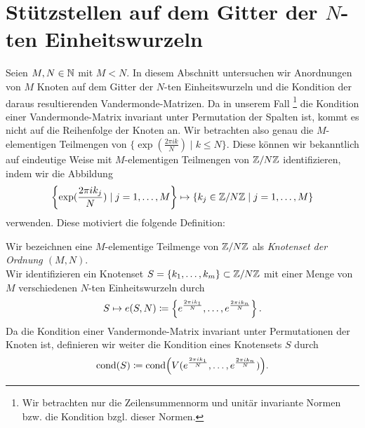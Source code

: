 \section{Stützstellen auf dem Gitter der $N$-ten Einheitswurzeln}
Seien $M, N \in \mathbb{N}$ mit $M < N$.
In diesem Abschnitt untersuchen wir Anordnungen von $M$ Knoten auf dem Gitter
der $N$-ten Einheitswurzeln und die Kondition der daraus resultierenden
Vandermonde-Matrizen.
Da in unserem Fall
\footnote{Wir betrachten nur die Zeilensummennorm und unitär invariante Normen bzw. die Kondition bzgl. dieser Normen.}
die Kondition einer Vandermonde-Matrix invariant unter
Permutation der Spalten ist, kommt es nicht auf die Reihenfolge der Knoten an.
Wir betrachten also genau die $M$-elementigen Teilmengen von
$\{ \exp( \frac{2 \pi i k}{N} ) \; | \; k \leq N \}$.
Diese können wir bekanntlich auf eindeutige Weise mit $M$-elementigen
Teilmengen von $ \mathbb{Z} / N\mathbb{Z}$ identifizieren, indem wir die Abbildung
\[
    \left\{ \exp( \frac{2 \pi i k_j}{N} ) \; | \; j = 1,\dots, M \right\} \mapsto \left\{ k_j \in \mathbb{Z}/N\mathbb{Z} \; | \; j = 1, \dots, M \right\}
\]
verwenden.
Diese motiviert die folgende Definition:

\begin{mydef}[Knotenset]
    Wir bezeichnen eine $M$-elementige Teilmenge von $\mathbb{Z}/N\mathbb{Z}$
    als \emph{Knotenset der Ordnung $(M,N)$}.\\
    Wir identifizieren ein Knotenset
    $S = \{k_1, \dots, k_m\} \subset \mathbb{Z}/N\mathbb{Z}$
    mit einer Menge von $M$ verschiedenen $N$-ten Einheitswurzeln durch
    \[
        S \mapsto e(S, N) \coloneqq \left\{ e^{\frac{2 \pi i k_1}{N}}, \dots, e^{\frac{2 \pi i k_n}{N}} \right\}.
    \]
    Da die Kondition einer Vandermonde-Matrix invariant unter Permutationen der
    Knoten ist, definieren wir weiter die Kondition eines Knotensets $S$ durch
    \[
        \text{cond$ \left( S \right)$} \coloneqq \text{cond$ \left( \text{$V( e^{\frac{2 \pi i k_1}{N}}, \dots, e^{\frac{2 \pi i k_n}{N}} )$} \right)$}.
    \]
\end{mydef}
